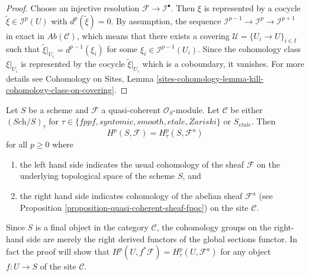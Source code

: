 \begin{proof}
Choose an injective resolution $\mathcal{F} \to \mathcal{I}^\bullet$. Then
$\xi$ is represented by a cocycle $\tilde{\xi} \in \mathcal{I}^p(U)$
with $d^p(\tilde{\xi}) = 0$. By assumption, the sequence
$\mathcal{I}^{p - 1} \to \mathcal{I}^p \to \mathcal{I}^{p + 1}$ in exact in
$\textit{Ab}(\mathcal{C})$, which means that there exists a covering
$\mathcal{U} = \{U_i \to U\}_{i \in I}$ such that
$\tilde{\xi}|_{U_i} = d^{p - 1}(\xi_i)$ for some
$\xi_i \in \mathcal{I}^{p-1}(U_i)$. Since
the cohomology class $\xi|_{U_i}$ is represented by the cocycle
$\tilde{\xi}|_{U_i}$ which is a coboundary, it vanishes.
For more details see
Cohomology on Sites,
Lemma \ref{sites-cohomology-lemma-kill-cohomology-class-on-covering}.
\end{proof}

\begin{theorem}
\label{theorem-zariski-fpqc-quasi-coherent}
Let $S$ be a scheme and $\mathcal{F}$ a quasi-coherent $\mathcal{O}_S$-module.
Let $\mathcal{C}$ be either $(\textit{Sch}/S)_\tau$ for
$\tau \in \{fppf, syntomic, smooth, etale, Zariski\}$ or $S_{etale}$.
Then
$$
H^p(S, \mathcal{F}) = H^p_\tau(S, \mathcal{F}^a)
$$
for all $p \geq 0$ where
\begin{enumerate}
\item the left hand side indicates the usual cohomology of the sheaf
$\mathcal{F}$ on the underlying topological space of the scheme $S$, and
\item the right hand side indicates cohomology
of the abelian sheaf $\mathcal{F}^a$ (see
Proposition \ref{proposition-quasi-coherent-sheaf-fpqc})
on the site $\mathcal{C}$.
\end{enumerate}
\end{theorem}

\begin{remark}
\label{remark-right-derived-global-sections}
Since $S$ is a final object in the category $\mathcal{C}$, the cohomology
groups on the right-hand side are merely the right derived functors of the
global sections functor. In fact the proof will show that
$H^p(U, f^*\mathcal{F}) = H^p_\tau(U, \mathcal{F}^a)$
for any object $f : U \to S$ of the site $\mathcal{C}$.
\end{remark}

